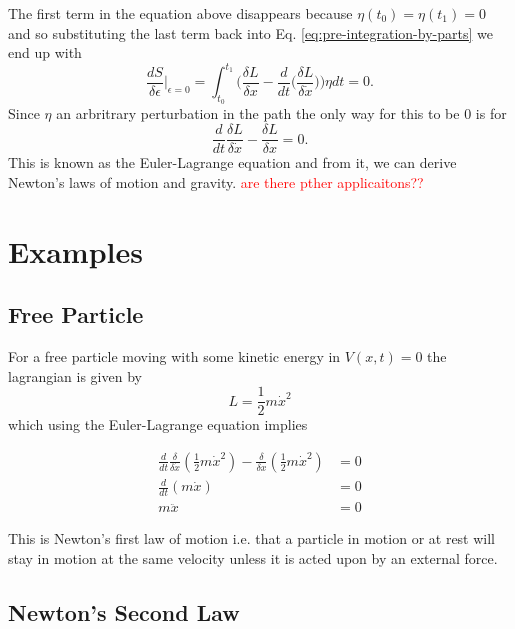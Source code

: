 \documentclass{article}
\begin{document}
The first term in the equation above disappears because $\eta(t_0) = \eta(t_1) = 0$ and so substituting the last term back into Eq. \ref{eq:pre-integration-by-parts} we end up with
\begin{equation}
    \frac{dS}{\delta \epsilon} \bigg|_{\epsilon = 0} = \int_{t_0}^{t_1} \bigg(\frac{\delta L}{\delta x} - \frac{d}{dt}\bigg(\frac{\delta L}{\delta \dot{x}}\bigg)\bigg) \eta dt = 0.
    \label{eq:pre-integration-by-parts}
\end{equation}
Since $\eta$ an arbritrary perturbation in the path the only way for this to be 0 is for
\begin{equation}
    \boxed{\frac{d}{dt}\frac{\delta L}{\delta \dot{x}} - \frac{\delta L}{\delta x} = 0.}
\end{equation}
This is known as the Euler-Lagrange equation and from it, we can derive Newton's laws of motion and gravity. \textcolor{red}{are there pther applicaitons??}

\section{Examples}

\subsection{Free Particle}

For a free particle moving with some kinetic energy in $V(x, t) = 0$ the lagrangian is given by
\begin{equation}
    L = \frac{1}{2} m \dot{x}^2
\end{equation}
which using the Euler-Lagrange equation implies

\begin{equation}
\begin{aligned}
    \frac{d}{dt}\frac{\delta}{\delta \dot{x}} (\frac{1}{2} m \dot{x}^2) - \frac{\delta}{\delta x} (\frac{1}{2} m \dot{x}^2) & = 0 \\
    \frac{d}{dt} (m \dot{x}) & = 0 \\
    m \ddot{x} & = 0
\end{aligned}
\end{equation}

This is Newton's first law of motion i.e. that a particle in motion or at rest will stay in motion at the same velocity unless it is acted upon by an external force.

\subsection{Newton's Second Law}
\end{document}
